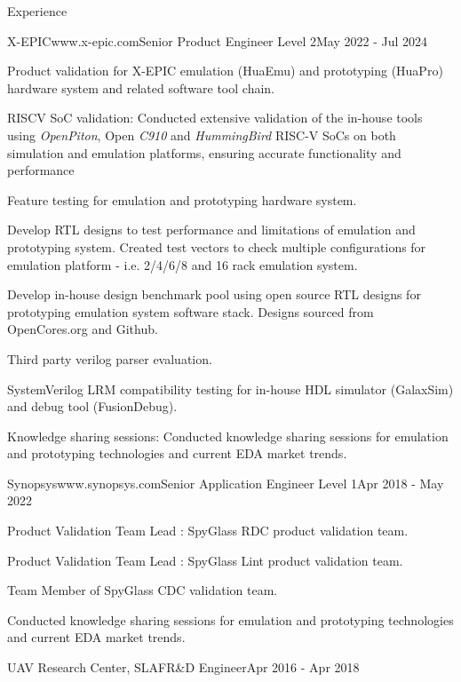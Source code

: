 \documentclass[
11pt, %
]{./assets/resume} %
\begin{document}
\begin{rSection}{Experience}
	\begin{rSubsectionX}{X-EPIC}{www.x-epic.com}{Senior Product Engineer Level 2}{May 2022 - Jul 2024}
		\item Product validation for X-EPIC emulation (HuaEmu) and prototyping (HuaPro) hardware system and related software tool chain.
		\item RISCV SoC validation: Conducted extensive validation of the in-house tools using \textit{OpenPiton}, Open \textit{C910} and \textit{HummingBird} RISC-V SoCs on both simulation and emulation platforms, ensuring accurate functionality and performance 
		\item Feature testing for emulation and prototyping hardware system.
		\item Develop RTL designs to test performance and limitations of emulation and prototyping system. Created test vectors to check multiple configurations for emulation platform - i.e. 2/4/6/8 and 16 rack emulation system.
		\item Develop in-house design benchmark pool using open source RTL designs for prototyping emulation system software stack. Designs sourced from OpenCores.org and Github.
		\item Third party verilog parser evaluation.
		\item SystemVerilog LRM compatibility testing for in-house HDL simulator (GalaxSim) and debug tool (FusionDebug).
		\item Knowledge sharing sessions: Conducted knowledge sharing sessions for emulation and prototyping technologies and current EDA market trends.
	\end{rSubsectionX}
	\begin{rSubsectionX}{Synopsys}{www.synopsys.com}{Senior Application Engineer Level 1}{Apr 2018 - May 2022}
		\item Product Validation Team Lead : SpyGlass RDC product validation team.
		\item Product Validation Team Lead : SpyGlass Lint product validation team.
		\item Team Member of SpyGlass CDC validation team.
		\item Conducted knowledge sharing sessions for emulation and prototyping technologies and current EDA market trends.
	\end{rSubsectionX}
	\begin{rSubsectionX}{UAV Research Center, SLAF}{}{R\&D Engineer}{Apr 2016 - Apr 2018}

\end{rSubsectionX}
\end{rSection}
\end{document}
